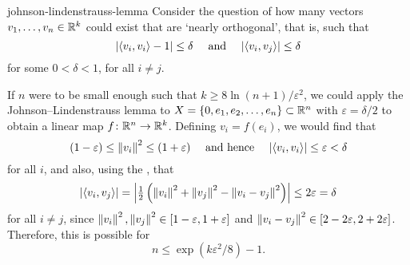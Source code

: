 \begin{example}{johnson-lindenstrauss-lemma}
    Consider the question of how many vectors $v_1, \ldots, v_n \in \mathbb{R}^k$ could exist that are `nearly orthogonal', that is, such that
    \[ |\langle v_i, v_i \rangle - 1| \le \delta \quad \textup{ and } \quad |\langle v_i, v_j \rangle| \le \delta \]
    for some $0 < \delta < 1$, for all $i \ne j$.
    
    If $n$ were to be small enough such that $k \ge 8 \ln (n + 1) / \varepsilon^2$, we could apply the Johnson--Lindenstrauss lemma to $X = \{ 0, e_1, e_2, \ldots, e_n \} \subset \mathbb{R}^n$ with $\varepsilon = \delta / 2$ to obtain a linear map $f \colon \mathbb{R}^n \to \mathbb{R}^k$. Defining $v_i = f(e_i)$, we would find that
    \[ (1 - \varepsilon) \le \left\|v_i\right\|^2 \le (1 + \varepsilon) \quad \textup{ and hence } \quad |\langle v_i, v_i \rangle| \le \varepsilon < \delta \]
    for all $i$, and also, using the , that
    \[ |\langle v_i, v_j \rangle| = \left| \tfrac{1}{2} \left( \left\|v_i\right\|^2 + \left\|v_j\right\|^2 - \left\|v_i - v_j\right\|^2 \right) \right| \le 2 \varepsilon = \delta \]
    for all $i \ne j$, since $\left\|v_i\right\|^2, \left\|v_j\right\|^2 \in [1 - \varepsilon, 1 + \varepsilon]$ and $\left\|v_i - v_j\right\|^2 \in [2 - 2 \varepsilon, 2 + 2 \varepsilon]$. Therefore, this is possible for
    \[ n \le \exp(k \varepsilon^2 / 8) - 1 . \]
\end{example}
